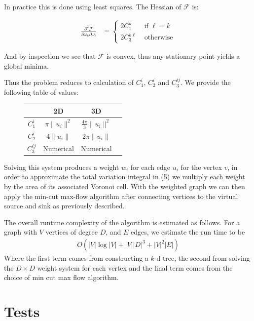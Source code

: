 \documentclass[12pt]{article}
\begin{document}
In practice this is done using least squares. The Hessian of $\mathcal{F}$ is:

\begin{align*}
\frac{\partial^2 \mathcal{F}}{\partial \omega_k \partial \omega_\ell} &= \begin{cases}
2C_1^k & \text{ if } \ell = k\\
2C_3^{k\ell} & \text{ otherwise}
\end{cases}
\end{align*}

And by inspection we see that $\mathcal{F}$ is convex, thus any stationary point yields a global minima. 

Thus the problem reduces to calculation of $C_1^i$, $C_2^i$ and $C_3^{ij}$. We provide the following table of values:

\begin{figure}[H]
\centering
\begin{tabular}{|c|c|c|c|}
\hline
 &  2D  & 3D  \\
\hline
 $C_1^i$ & $\pi \| u_i \|^2$  & $\frac{4\pi}{3}\|u_i\|^2$   \\
\hline
 $C_2^i$ & $4\| u_i \|$  & $2\pi \|u_i\|$    \\
\hline
 $C_3^{ij}$ & Numerical  & Numerical    \\
\hline
\end{tabular}
\end{figure}

Solving this system produces a weight $w_i$ for each edge $u_i$ for the vertex $v$, in order to approximate the total variation integral in (5) we multiply each weight by the area of its associated Voronoi cell. With the weighted graph we can then apply the min-cut max-flow algorithm after connecting vertices to the virtual source and sink as previously described.

The overall runtime complexity of the algorithm is estimated as follows. For a graph with $V$ vertices of degree $D$, and $E$ edges, we estimate the run time to be
\begin{align}
	O(|V|\log|V| + |V||D|^3 + |V|^2|E|)
\end{align}
Where the first term comes from constructing a $k$-d tree, the second from solving the $D \times D$ weight system for each vertex and the final term comes from the choice of min cut max flow algorithm.  


\section{Tests}
\end{document}

